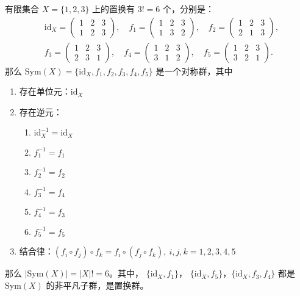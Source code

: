 \begin{example}
    有限集合 $X=\{1,2,3\}$ 上的置换有 $3! = 6$ 个，分别是：
    \[
        \begin{aligned}
            &\mathrm{id}_X = \begin{pmatrix}1 & 2 & 3 \\ 1 & 2 & 3\end{pmatrix},\quad
            f_1 = \begin{pmatrix}1 & 2 & 3 \\ 1 & 3 & 2\end{pmatrix},\quad
            f_2 = \begin{pmatrix}1 & 2 & 3 \\ 2 & 1 & 3\end{pmatrix},\\
            &f_3 = \begin{pmatrix}1 & 2 & 3 \\ 2 & 3 & 1\end{pmatrix},\quad
            f_4 = \begin{pmatrix}1 & 2 & 3 \\ 3 & 1 & 2\end{pmatrix},\quad
            f_5 = \begin{pmatrix}1 & 2 & 3 \\ 3 & 2 & 1\end{pmatrix}.
        \end{aligned}
    \]
    那么 $\mathrm{Sym}(X) = \{\mathrm{id}_X, f_1, f_2, f_3, f_4, f_5\}$ 是一个对称群，其中
    \begin{enumerate}
        \item 存在单位元：$\mathrm{id}_X$
        \item 存在逆元：
            \begin{enumerate}
                \item $\mathrm{id}_X^{-1} = \mathrm{id}_X$
                \item $f_1^{-1} = f_1$
                \item $f_2^{-1} = f_2$
                \item $f_3^{-1} = f_4$
                \item $f_4^{-1} = f_3$
                \item $f_5^{-1} = f_5$
            \end{enumerate}
        \item 结合律：$(f_i \circ f_j) \circ f_k = f_i \circ (f_j \circ f_k),\ i,j,k=1,2,3,4,5$
    \end{enumerate}
    那么 $|\mathrm{Sym}(X)| = |X|! = 6$。其中， $\{\mathrm{id}_X, f_1\}$， $\{\mathrm{id}_X, f_5\}$，$\{\mathrm{id}_X, f_3, f_4\}$ 都是 $\mathrm{Sym}(X)$ 的非平凡子群，是置换群。
    \label{ex:permutation_group_s3}
\end{example}

